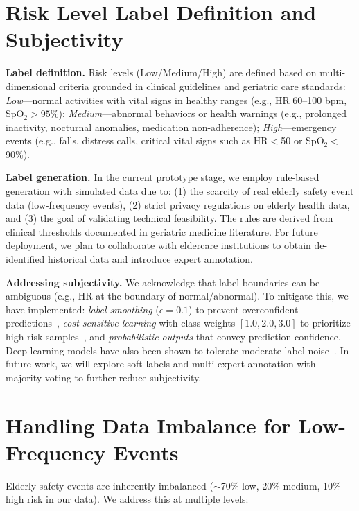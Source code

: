 \documentclass[10pt,twocolumn,letterpaper]{article}
\begin{document}
\section{Risk Level Label Definition and Subjectivity}

\noindent\textbf{Label definition.} Risk levels (Low/Medium/High) are defined based on multi-dimensional criteria grounded in clinical guidelines and geriatric care standards: \emph{Low}—normal activities with vital signs in healthy ranges (e.g., HR 60--100 bpm, SpO$_2{>}95\%$); \emph{Medium}—abnormal behaviors or health warnings (e.g., prolonged inactivity, nocturnal anomalies, medication non-adherence); \emph{High}—emergency events (e.g., falls, distress calls, critical vital signs such as HR${<}$50 or SpO$_2{<}$90\%).

\noindent\textbf{Label generation.} In the current prototype stage, we employ rule-based generation with simulated data due to: (1) the scarcity of real elderly safety event data (low-frequency events), (2) strict privacy regulations on elderly health data, and (3) the goal of validating technical feasibility. The rules are derived from clinical thresholds documented in geriatric medicine literature. For future deployment, we plan to collaborate with eldercare institutions to obtain de-identified historical data and introduce expert annotation.

\noindent\textbf{Addressing subjectivity.} We acknowledge that label boundaries can be ambiguous (e.g., HR at the boundary of normal/abnormal). To mitigate this, we have implemented: \emph{label smoothing} ($\epsilon{=}0.1$) to prevent overconfident predictions~\cite{muller2019label}, \emph{cost-sensitive learning} with class weights $[1.0, 2.0, 3.0]$ to prioritize high-risk samples~\cite{elkan2001foundations}, and \emph{probabilistic outputs} that convey prediction confidence. Deep learning models have also been shown to tolerate moderate label noise~\cite{rolnick2017deep}. In future work, we will explore soft labels and multi-expert annotation with majority voting to further reduce subjectivity.

\section{Handling Data Imbalance for Low-Frequency Events}

Elderly safety events are inherently imbalanced (${\sim}$70\% low, 20\% medium, 10\% high risk in our data). We address this at multiple levels:
\end{document}
